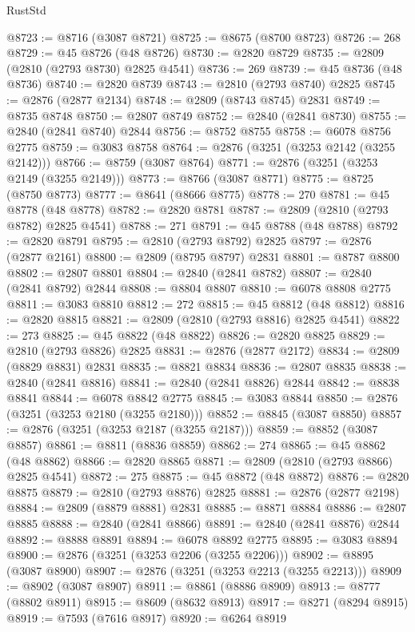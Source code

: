 \begin{lexlean}{RustStd}
\begin{coremodule}
@8723 := @8716 (@3087 @8721)
@8725 := @8675 (@8700 @8723)
@8726 := 268
@8729 := @45 @8726 (@48 @8726)
@8730 := @2820 @8729
@8735 := @2809 (@2810 (@2793 @8730) @2825 @4541)
@8736 := 269
@8739 := @45 @8736 (@48 @8736)
@8740 := @2820 @8739
@8743 := @2810 (@2793 @8740) @2825
@8745 := @2876 (@2877 @2134)
@8748 := @2809 (@8743 @8745) @2831
@8749 := @8735 @8748
@8750 := @2807 @8749
@8752 := @2840 (@2841 @8730)
@8755 := @2840 (@2841 @8740) @2844
@8756 := @8752 @8755
@8758 := @6078 @8756 @2775
@8759 := @3083 @8758
@8764 := @2876 (@3251 (@3253 @2142 (@3255 @2142)))
@8766 := @8759 (@3087 @8764)
@8771 := @2876 (@3251 (@3253 @2149 (@3255 @2149)))
@8773 := @8766 (@3087 @8771)
@8775 := @8725 (@8750 @8773)
@8777 := @8641 (@8666 @8775)
@8778 := 270
@8781 := @45 @8778 (@48 @8778)
@8782 := @2820 @8781
@8787 := @2809 (@2810 (@2793 @8782) @2825 @4541)
@8788 := 271
@8791 := @45 @8788 (@48 @8788)
@8792 := @2820 @8791
@8795 := @2810 (@2793 @8792) @2825
@8797 := @2876 (@2877 @2161)
@8800 := @2809 (@8795 @8797) @2831
@8801 := @8787 @8800
@8802 := @2807 @8801
@8804 := @2840 (@2841 @8782)
@8807 := @2840 (@2841 @8792) @2844
@8808 := @8804 @8807
@8810 := @6078 @8808 @2775
@8811 := @3083 @8810
@8812 := 272
@8815 := @45 @8812 (@48 @8812)
@8816 := @2820 @8815
@8821 := @2809 (@2810 (@2793 @8816) @2825 @4541)
@8822 := 273
@8825 := @45 @8822 (@48 @8822)
@8826 := @2820 @8825
@8829 := @2810 (@2793 @8826) @2825
@8831 := @2876 (@2877 @2172)
@8834 := @2809 (@8829 @8831) @2831
@8835 := @8821 @8834
@8836 := @2807 @8835
@8838 := @2840 (@2841 @8816)
@8841 := @2840 (@2841 @8826) @2844
@8842 := @8838 @8841
@8844 := @6078 @8842 @2775
@8845 := @3083 @8844
@8850 := @2876 (@3251 (@3253 @2180 (@3255 @2180)))
@8852 := @8845 (@3087 @8850)
@8857 := @2876 (@3251 (@3253 @2187 (@3255 @2187)))
@8859 := @8852 (@3087 @8857)
@8861 := @8811 (@8836 @8859)
@8862 := 274
@8865 := @45 @8862 (@48 @8862)
@8866 := @2820 @8865
@8871 := @2809 (@2810 (@2793 @8866) @2825 @4541)
@8872 := 275
@8875 := @45 @8872 (@48 @8872)
@8876 := @2820 @8875
@8879 := @2810 (@2793 @8876) @2825
@8881 := @2876 (@2877 @2198)
@8884 := @2809 (@8879 @8881) @2831
@8885 := @8871 @8884
@8886 := @2807 @8885
@8888 := @2840 (@2841 @8866)
@8891 := @2840 (@2841 @8876) @2844
@8892 := @8888 @8891
@8894 := @6078 @8892 @2775
@8895 := @3083 @8894
@8900 := @2876 (@3251 (@3253 @2206 (@3255 @2206)))
@8902 := @8895 (@3087 @8900)
@8907 := @2876 (@3251 (@3253 @2213 (@3255 @2213)))
@8909 := @8902 (@3087 @8907)
@8911 := @8861 (@8886 @8909)
@8913 := @8777 (@8802 @8911)
@8915 := @8609 (@8632 @8913)
@8917 := @8271 (@8294 @8915)
@8919 := @7593 (@7616 @8917)
@8920 := @6264 @8919

\end{coremodule}
\end{lexlean}
